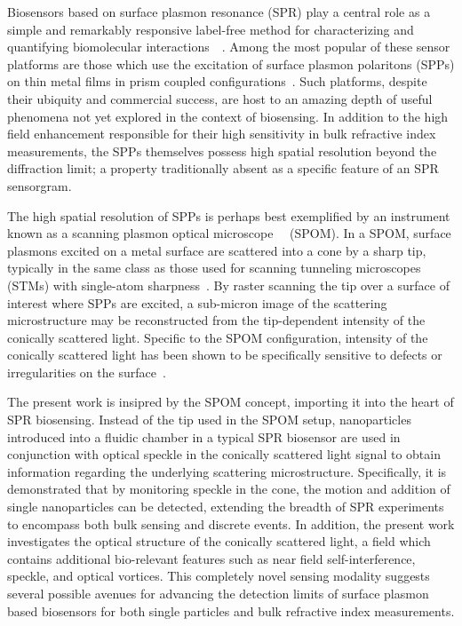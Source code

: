 Biosensors based on surface plasmon resonance (SPR) play a central role as
a simple and remarkably responsive label-free method for characterizing and
quantifying biomolecular
interactions~\cite{homola1999surface}~\cite{homola2006surface}.  Among the most
popular of these sensor platforms are those which use the excitation of surface
plasmon polaritons (SPPs) on thin metal films in prism coupled
configurations~\cite{hoa2007towards}.  Such platforms, despite their ubiquity
and commercial success, are host to an amazing depth of useful phenomena not
yet explored in the context of biosensing.  In addition to the high field
enhancement responsible for their high sensitivity in bulk refractive index
measurements, the SPPs themselves possess high spatial resolution beyond the
diffraction limit; a property traditionally absent as a specific feature of an
SPR sensorgram.

The high spatial resolution of SPPs is perhaps best exemplified by an
instrument known as a scanning plasmon optical
microscope~\cite{kim1995scanning}~\cite{kim1996scanning} (SPOM).  In a SPOM,
surface plasmons excited on a metal surface are scattered into a cone by
a sharp tip, typically in the same class as those used for scanning tunneling
microscopes (STMs) with single-atom sharpness~\cite{binnig2000scanning}.  By
raster scanning the tip over a surface of interest where SPPs are excited,
a sub-micron image of the scattering microstructure may be reconstructed from
the tip-dependent intensity of the conically scattered light.  Specific to the
SPOM configuration, intensity of the conically scattered light has been shown
to be specifically sensitive to defects or irregularities on the
surface~\cite{kim1996scanning}.

The present work is insipred by the SPOM concept, importing it into the heart
of SPR biosensing.  Instead of the tip used in the SPOM setup, nanoparticles
introduced into a fluidic chamber in a typical SPR biosensor are used in
conjunction with optical speckle in the conically scattered light signal to
obtain information regarding the underlying scattering microstructure.
Specifically, it is demonstrated that by monitoring speckle in the cone, the
motion and addition of single nanoparticles can be detected, extending the
breadth of SPR experiments to encompass both bulk sensing and discrete events.
In addition, the present work investigates the optical structure of the
conically scattered light, a field which contains additional bio-relevant
features such as near field self-interference, speckle, and optical vortices.
This completely novel sensing modality suggests several possible avenues for
advancing the detection limits of surface plasmon based biosensors for both
single particles and bulk refractive index measurements.
